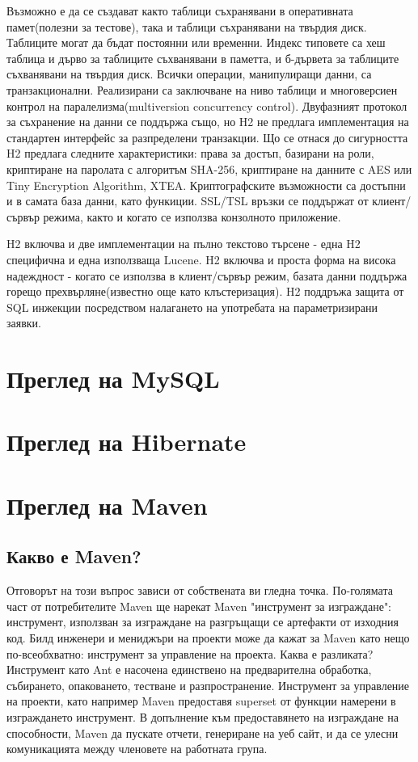 Възможно е да се създават както таблици съхранявани в оперативната
памет(полезни за тестове), така и таблици съхранявани на твърдия
диск. Таблиците могат да бъдат постоянни или временни. Индекс типовете
са хеш таблица и дърво за таблиците съхванявани в паметта, и б-дървета
за таблиците съхванявани на твърдия диск. Всички операции,
манипулиращи данни, са транзакционални. Реализирани са заключване на
ниво таблици и многоверсиен контрол на паралелизма(multiversion
concurrency control). Двуфазният протокол за съхранение на данни се
поддържа също, но H2 не предлага имплементация на стандартен интерфейс
за разпределени транзакции. Що се отнася до сигурността H2 предлага
следните характеристики: права за достъп, базирани на роли, криптиране
на паролата с алгоритъм SHA-256, криптиране на данните с AES или Tiny
Encryption Algorithm, XTEA. Криптографските възможности са достъпни и
в самата база данни, като функиции. SSL/TSL връзки се поддържат от
клиент/сървър режима, както и когато се използва конзолното
приложение.

H2 включва и две имплементации на пълно текстово търсене - една H2
специфична и една използваща Lucene. H2 включва и проста форма на
висока надеждност - когато се използва в клиент/сървър режим, базата
данни поддържа горещо прехвърляне(известно още като клъстеризация). H2
поддръжа защита от SQL инжекции посредством налагането на употребата
на параметризирани заявки.  
\section{Преглед на MySQL}
\section{Преглед на Hibernate}
\section{Преглед на Maven}
\subsection{Какво е Maven?} 
Отговорът на този въпрос зависи от собствената ви
гледна точка. По-голямата част от потребителите Maven ще нарекат Maven
"инструмент за изграждане": инструмент, използван за изграждане на
разгръщащи се артефакти от изходния код. Билд инженери и мениджъри на
проекти може да кажат за Maven като нещо по-всеобхватно: инструмент за
управление на проекта. Каква е разликата? Инструмент като Ant е
насочена единствено на предварителна обработка, събирането,
опаковането, тестване и разпространение. Инструмент за управление на
проекти, като например Maven предоставя superset от функции намерени в
изграждането инструмент. В допълнение към предоставянето на изграждане
на способности, Maven да пускате отчети, генериране на уеб сайт, и да
се улесни комуникацията между членовете на работната група.

